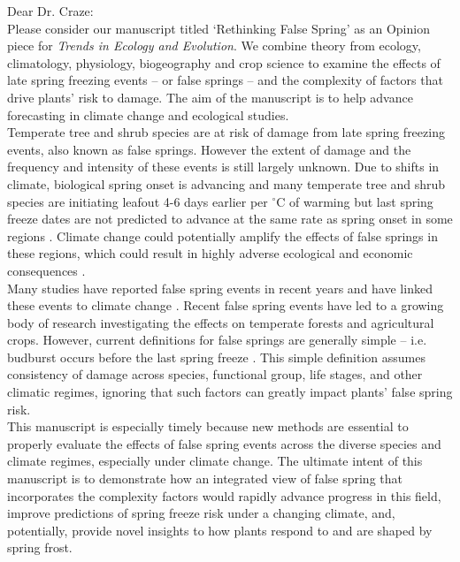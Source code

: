 \documentclass[11pt,a4paper]{article}\usepackage[]{graphicx}\usepackage[]{color}
\begin{document}
\noindent Dear Dr. Craze:
\vspace{1.5ex}\\
\noindent Please consider our manuscript titled `Rethinking False Spring' as an Opinion piece for \textit{Trends in Ecology and Evolution}. We combine theory from ecology, climatology, physiology, biogeography and crop science to examine the effects of late spring freezing events -- or false springs -- and the complexity of factors that drive plants' risk to damage. The aim of the manuscript is to help advance forecasting in climate change and ecological studies. \\

\noindent Temperate tree and shrub species are at risk of damage from late spring freezing events, also known as false springs. However the extent of damage and the frequency and intensity of these events is still largely unknown. Due to shifts in climate, biological spring onset is advancing and many temperate tree and shrub species are initiating leafout 4-6 days earlier per $^{\circ}$C of warming \citep{Wolkovich2012, Polgar2014} but last spring freeze dates are not predicted to advance at the same rate as spring onset in some regions \citep{Labe2016}. Climate change could potentially amplify the effects of false springs in these regions, which could result in highly adverse ecological and economic consequences \citep{Ault2013, Vitra2017}. \\

\noindent Many studies have reported false spring events in recent years and have linked these events to climate change \citep[e.g.][]{Augspurger2013, Menzel2015}. Recent false spring events have led to a growing body of research investigating the effects on temperate forests and agricultural crops. However, current definitions for false springs are generally simple -- i.e. budburst occurs before the last spring freeze \citep{Gu2008}. This simple definition assumes consistency of damage across species, functional group, life stages, and other climatic regimes, ignoring that such factors can greatly impact plants' false spring risk. \\

\noindent This manuscript is especially timely because new methods are essential to properly evaluate the effects of false spring events across the diverse species and climate regimes, especially under climate change. The ultimate intent of this manuscript is to demonstrate how an integrated view of false spring that incorporates the complexity factors would rapidly advance progress in this field, improve predictions of spring freeze risk under a changing climate, and, potentially, provide novel insights to how plants respond to and are shaped by spring frost. \\
\end{document}
